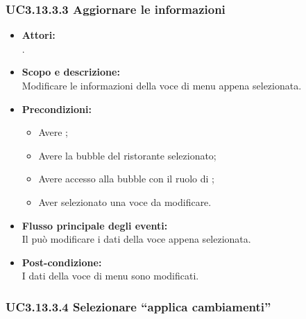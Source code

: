 \subsubsection{UC3.13.3.3 Aggiornare le informazioni} \label{UC3.13.3.3}

\begin{itemize}
	\item \textbf{Attori:}
	\\.
	\item \textbf{Scopo e descrizione:} 
	\\Modificare le informazioni della voce di menu appena selezionata.
	\item \textbf{Precondizioni:}
	\begin{itemize}
		\item Avere ;
		\item Avere la bubble del ristorante selezionato;
		\item Avere accesso alla bubble con il ruolo di ;
		\item Aver selezionato una voce da modificare.
	\end{itemize}
	\item \textbf{Flusso principale degli eventi:}
	\\Il {} può modificare i dati della voce appena selezionata.
	\item \textbf{Post-condizione:}
	\\I dati della voce di menu sono modificati.
\end{itemize}

\subsubsection{UC3.13.3.4 Selezionare “applica cambiamenti”} \label{UC3.13.3.4}

